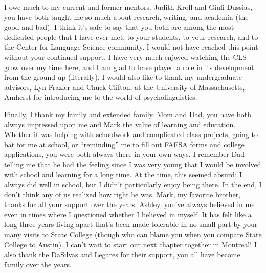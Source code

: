 I owe much to my current and former mentors. Judith Kroll and Giuli Dussias, you have both taught me so much about research, writing, and academia (the good and bad). I think it's safe to say that you both are among the most dedicated people that I have ever met, to your students, to your research, and to the Center for Language Science community. I would not have reached this point without your continued support. I have very much enjoyed watching the CLS grow over my time here, and I am glad to have played a role in its development from the ground up (literally). I would also like to thank my undergraduate advisors, Lyn Frazier and Chuck Clifton, at the University of Massachusetts, Amherst for introducing me to the world of psycholinguistics.

Finally, I thank my family and extended family. Mom and Dad, you have both always impressed upon me and Mark the value of learning and education. Whether it was helping with schoolwork and complicated class projects, going to bat for me at school, or ``reminding'' me to fill out FAFSA forms and college applications, you were both always there in your own ways. I remember Dad telling me that he had the feeling since I was very young that I would be involved with school and learning for a long time. At the time, this seemed absurd; I always did well in school, but I didn't particularly enjoy being there. In the end, I don't think any of us realized how right he was.  Mark, my favorite brother, thanks for all your support over the years. Ashley, you've always believed in me even in times where I questioned whether I believed in myself.  It has felt like a long three years living apart that's been made tolerable in no small part by your many visits to State College (though who can blame you when you compare State College to Austin).  I can't wait to start our next chapter together in Montreal! I also thank the DaSilvas and Legares for their support, you all have become family over the years. 
